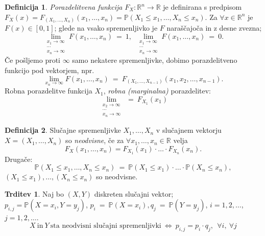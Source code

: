 \documentclass[11pt]{article}
\theoremstyle{definition}
\newtheorem{definicija}{Definicija}[section]
\theoremstyle{definition}
\newtheorem{trditev}{Trditev}[section]
\theoremstyle{definition}
\begin{document}
\begin{definicija}

\textit{Porazdelitvena funkcija} $F_X: \mathbb{R}^n \rightarrow \mathbb{R}$ je definirana s predpisom $F_X(x) = F_{(X_1, \ldots, X_n)}(x_1, \ldots, x_n) = \mathbb{P}(X_1 \leq x_1, \ldots, X_n \leq x_n)$. Za $\forall x \in \mathbb{R}^n$ je $F(x) \in [0, 1]$; glede na vsako spremenljivko je $F$ naraščajoča in z desne zvezna;
$$\lim_{\substack{x_1 \rightarrow \infty \\ \cdots \\ x_n \rightarrow \infty}} F(x_1, \ldots, x_n) ~=~ 1, ~~\lim_{\substack{x_1 \rightarrow \infty \\ \cdots \\ x_n \rightarrow \infty}} F(x_1, \ldots, x_n) ~=~ 0.$$
Če pošljemo proti $\infty$ samo nekatere spremenljivke, dobimo porazdelitveno funkcijo pod vektorjem, npr.
$$\lim_{x_n \rightarrow \infty} F(x_1, \ldots, x_n) ~=~ F_{(X_1, \ldots, X_{n-1})}(x_1, x_2, \ldots, x_{n-1}).$$
Robna porazdelitve funkcija $X_1$, \textit{robna (marginalna)} porazdelitev:
$$\lim_{\substack{x_2 \rightarrow \infty \\ \cdots \\ x_n \rightarrow \infty}} ~=~ F_{X_1}(x_1)$$

\end{definicija}
\vspace{0.5cm}

\begin{definicija}

Slučajne spremenljivke $X_1, \ldots, X_n$ v slučajnem vektorju $X = (X_1, \ldots, X_n)$ so \textit{neodvisne}, če za $\forall x_1, \ldots, x_n \in \mathbb{R}$ velja 
$$F_X(x_1, \ldots, x_n) = F_{X_1}(x_1) \cdot \ldots \cdot F_{X_n}(x_n).$$
Drugače:
$$\mathbb{P}(X_1 \leq x_1, \ldots, X_n \leq x_n) ~=~ \mathbb{P}(X_1 \leq x_1) \cdot \ldots \cdot \mathbb{P}(X_n \leq x_n),$$ 
$(X_1 \leq x_1), \ldots, (X_n \leq x_n)$ so neodvisne.


\end{definicija}
\vspace{0.5cm}

\begin{trditev}

Naj bo $(X, Y)$ diskreten slučajni vektor; \\$p_{i,j} = \mathbb{P}(X = x_i, Y = y_j)$, $p_i ~=~ \mathbb{P}(X = x_i), q_j ~=~ \mathbb{P}(Y = y_j)$, $i = 1, 2, \ldots$, $j = 1, 2, \ldots$.
$$X ~\text{in}~ Y ~\text{sta neodvisni slučajni spremenljivki}~ \iff ~p_{i,j} = p_i \cdot q_j, ~~\forall i, ~\forall j $$

\end{trditev}
\vspace{0.5cm}
\end{document}
